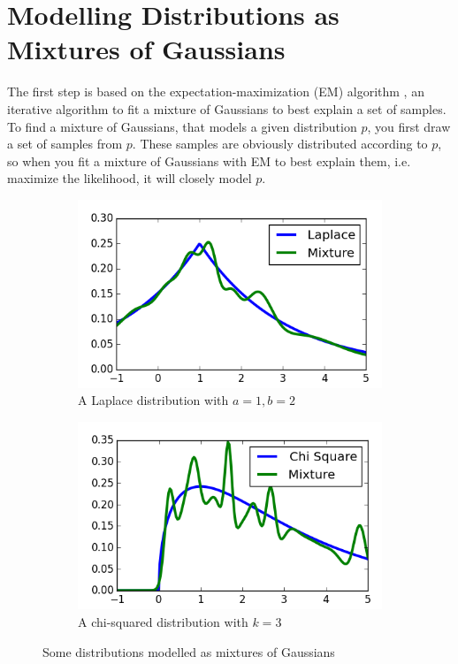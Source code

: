 \documentclass[11pt,a4paper]{book}
\begin{document}
\section{Modelling Distributions as Mixtures of Gaussians}
\label{sec:em}

The first step is based on the expectation-maximization (EM) algorithm
\cite[chapter~11.4.2]{murphy}, an iterative algorithm to fit a mixture of
Gaussians to best explain a set of samples. To find a mixture of Gaussians, that
models a given distribution $p$, you first draw a set of samples from $p$. These
samples are obviously distributed according to $p$, so when you fit a mixture of
Gaussians with EM to best explain them, i.e. maximize the likelihood, it will
closely model $p$.

\begin{figure}[h]
  \centering
  \begin{subfigure}{0.45\textwidth}
    \centering
    \includegraphics[width=\textwidth]{thesis/theory/em-laplace}
    \caption{A Laplace distribution with $a = 1, b = 2$}
  \end{subfigure}
  \hfill
  \begin{subfigure}{0.45\textwidth}
    \centering
    \includegraphics[width=\textwidth]{thesis/theory/em-chisq}
    \caption{A chi-squared distribution with $k = 3$}
  \end{subfigure}
  \caption{Some distributions modelled as mixtures of Gaussians}
  \label{fig:theory-em}
\end{figure}
\end{document}
